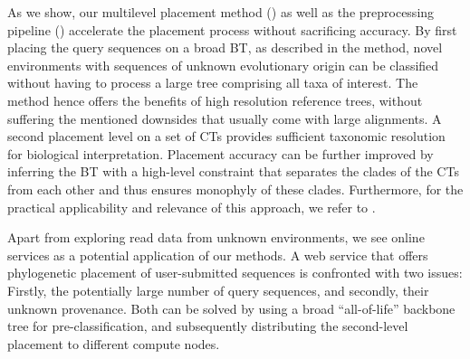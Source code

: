 As we show, our multilevel placement method ()
as well as the preprocessing pipeline ()
accelerate the placement process without sacrificing accuracy.
By first placing the query sequences on a broad \acf{BT}, as described in the method,
novel environments with sequences of unknown evolutionary origin can be classified
without having to process a large tree comprising all taxa of interest.
The method hence offers the benefits of high resolution reference trees,
without suffering the mentioned downsides that usually come with large alignments.
A second placement level on a set of \acfp{CT} provides sufficient taxonomic resolution for biological interpretation.
Placement accuracy can be further improved by inferring the \ac{BT}
with a high-level constraint that separates the clades of the \acp{CT} from each other
and thus ensures monophyly of these clades.
Furthermore, for the practical applicability and relevance of this approach, we refer to \citep{Mahe2017}.

Apart from exploring read data from unknown environments,
we see online services as a potential application of our methods.
A web service that offers phylogenetic placement of user-submitted sequences is confronted with two issues:
Firstly, the potentially large number of query sequences, and secondly, their unknown provenance.
Both can be solved by using a broad ``all-of-life'' backbone tree for pre-classification,
and subsequently distributing the second-level placement to different compute nodes.



